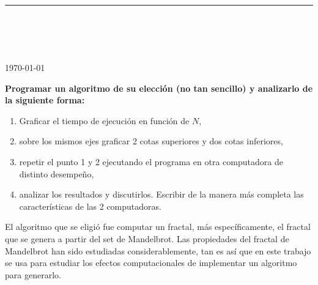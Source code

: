 

\newcommand{\diannao}{\texttt{diannao}}
\newcommand{\hongdiannao}{\texttt{hongdiannao}}



\thispagestyle{empty}

\begin{center}
\textsc{\theinstitution}\\[2mm]

\thedepartment

\rule{0.6\textwidth}{0.5pt}\\[2mm]

\thecourse \\[4mm]

{\Large \textbf{\thetitle}}\\[2mm]

\theauthor \\[2mm]

{\small \today}
\end{center}
\medskip

\vspace{1cm}

\textbf{%
Programar un algoritmo de su elección (no tan sencillo) y analizarlo de la siguiente forma:}
\begin{enumerate}
    \item Graficar el tiempo de ejecución en función de $N$,
    \item sobre los mismos ejes graficar 2 cotas superiores y dos cotas inferiores,
    \item repetir el punto 1 y 2 ejecutando el programa en otra computadora de distinto desempeño,
    \item analizar los resultados y discutirlos. Escribir de la manera más completa las características de las 2 computadoras.
\end{enumerate}

\vspace{1cm}

El algoritmo que se eligió fue computar un fractal, más específicamente, el fractal que se genera a partir del set de Mandelbrot. Las propiedades del fractal de Mandelbrot han sido estudiadas considerablemente, tan es así que en este trabajo se usa para estudiar los efectos computacionales de implementar un algoritmo para generarlo.

